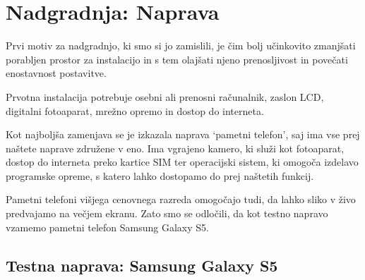 \documentclass[a4paper, 12pt]{book}
\begin{document}
\chapter{Nadgradnja: Naprava}
\label{ch:nadgradnjaNaprava}
Prvi motiv za nadgradnjo, ki smo si jo zamislili, je čim bolj učinkovito zmanjšati
porabljen prostor za instalacijo in s tem olajšati njeno prenosljivost in
povečati enostavnost postavitve.

Prvotna instalacija potrebuje osebni ali prenosni računalnik, zaslon LCD,
digitalni fotoaparat, mrežno opremo in dostop do interneta.

Kot najboljša zamenjava se je izkazala naprava `pametni telefon', saj ima
vse prej naštete naprave združene v eno. Ima vgrajeno kamero, ki služi kot
fotoaparat, dostop do interneta preko kartice SIM ter operacijski sistem, ki
omogoča izdelavo programske opreme, s katero lahko dostopamo do prej naštetih
funkcij.

Pametni telefoni višjega cenovnega razreda omogočajo tudi, da lahko sliko v živo
predvajamo na večjem ekranu. Zato smo se odločili, da kot testno napravo
vzamemo pametni telefon Samsung Galaxy S5.

\section{Testna naprava: Samsung Galaxy S5}
\label{sec:testnaNapravaSmartPhone}
\end{document}
